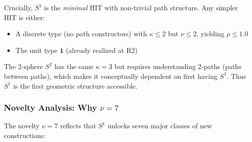 \documentclass[11pt]{article}
\theoremstyle{definition}
\begin{document}
Crucially, $S^1$ is the \emph{minimal} HIT with non-trivial path structure. Any simpler HIT is either:
\begin{itemize}
\item A discrete type (no path constructors) with $\kappa \leq 2$ but $\nu \leq 2$, yielding $\rho \leq 1.0$
\item The unit type $\mathbf{1}$ (already realized at R2)
\end{itemize}

The 2-sphere $S^2$ has the same $\kappa=3$ but requires understanding 2-paths (paths between paths), which makes it conceptually dependent on first having $S^1$. Thus $S^1$ is the first geometric structure accessible.

\subsubsection{Novelty Analysis: Why $\nu = 7$}

The novelty $\nu=7$ reflects that $S^1$ unlocks seven major classes of new constructions:
\end{document}
